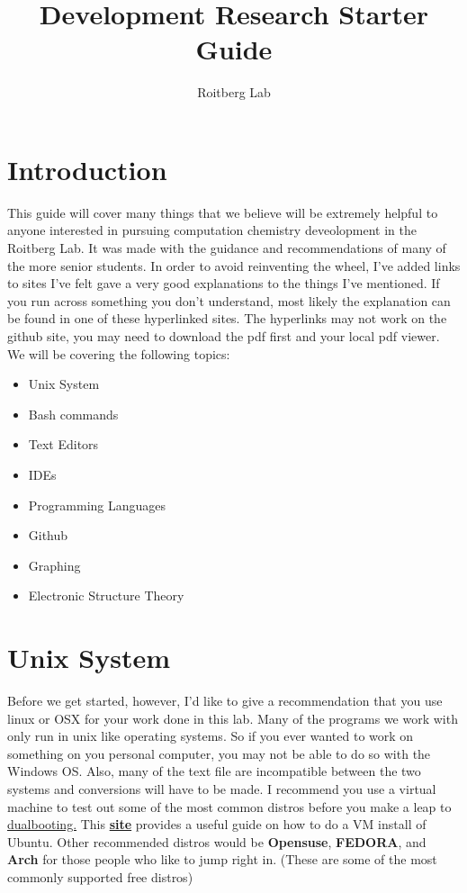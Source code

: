 \documentclass{article}
\begin{document}
\title{Development Research Starter Guide}
\author{Roitberg Lab}
\maketitle

\section*{Introduction}

This guide will cover many things that we believe will be extremely helpful to anyone interested in pursuing computation chemistry deveolopment in the Roitberg Lab. 
It was made with the guidance and recommendations of many of the more senior students. 
In order to avoid reinventing the wheel, I've added links to sites I've felt gave a very good explanations to the things I've mentioned.
If you run across something you don't understand, most likely the explanation can be found in one of these hyperlinked sites.
The hyperlinks may not work on the github site, you may need to download the pdf first and your local pdf viewer.
We will be covering the following topics: \\

\begin{itemize}
\item Unix System
\item Bash commands
\item Text Editors
\item IDEs
\item Programming Languages
\item Github
\item Graphing
\item Electronic Structure Theory
\end{itemize}

\section*{Unix System}
Before we get started, however, I'd like to give a recommendation that you use linux or OSX for your work done in this lab. 
Many of the programs we work with only run in unix like operating systems.
So if you ever wanted to work on something on you personal computer, you may not be able to do so with the Windows OS. 
Also, many of the text file are incompatible between the two systems and conversions will have to be made.
I recommend you use a virtual machine to test out some of the most common distros before you make a leap to \href{https://help.ubuntu.com/community/WindowsDualBoot}{dualbooting.}
This \href{http://henricasanova.github.io/VirtualBoxUbuntuHowTo.html}{\textbf{site}} provides a useful guide on how to do a VM install of Ubuntu.
Other recommended distros would be \textbf{Opensuse}, \textbf{FEDORA}, and \textbf{Arch} for those people who like to jump right in. (These are some of the most commonly supported free distros)
\end{document}
